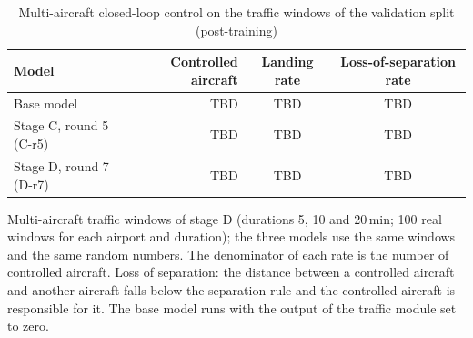 \begin{table}[htbp]
  \centering
  \caption{Multi-aircraft closed-loop control on the traffic windows of the validation split (post-training)}
  \label{tab:two_tier_val_multi}
  \begin{tabular}{lrcc}
    \toprule
    Model & Controlled aircraft & Landing rate & Loss-of-separation rate \\
    \midrule
    Base model              & TBD & TBD & TBD \\
    Stage C, round 5 (C-r5) & TBD & TBD & TBD \\
    Stage D, round 7 (D-r7) & TBD & TBD & TBD \\
    \bottomrule
  \end{tabular}
  \par\smallskip
  \parbox{0.95\linewidth}{\footnotesize
    Multi-aircraft traffic windows of stage D (durations 5, 10 and 20\,min; 100 real windows for each airport and
    duration); the three models use the same windows and the same random numbers. The denominator of each rate is the
    number of controlled aircraft. Loss of separation: the distance between a controlled aircraft and another aircraft
    falls below the separation rule and the controlled aircraft is responsible for it. The base model runs with the
    output of the traffic module set to zero.}
\end{table}
